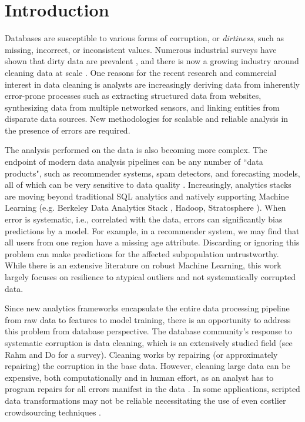 \section{Introduction}
Databases are susceptible to various forms of corruption, or \emph{dirtiness}, such as missing, incorrect, or inconsistent values.
Numerous industrial surveys have shown that dirty data are prevalent \cite{Gartner}, and there is now a growing industry around cleaning data at scale \cite{fortunearticle}.
One reasons for the recent research and commercial interest in data cleaning is analysts are increasingly deriving data from inherently error-prone processes such as extracting structured data from websites, synthesizing data from multiple networked sensors, and linking entities from disparate data sources.
New methodologies for scalable and reliable analysis in the presence of errors are required. 

The analysis performed on the data is also becoming more complex.
The endpoint of modern data analysis pipelines can be any number of ``data products", such as recommender systems, spam detectors, and forecasting models, all of which can be very sensitive to data quality \cite{xiaofeature}.
Increasingly, analytics stacks are moving beyond traditional SQL analytics and natively supporting Machine Learning (e.g. Berkeley Data Analytics Stack \cite{bdas}, Hadoop, Stratosphere \cite{alexandrov2014stratosphere}).
When error is systematic, i.e., correlated with the data, errors can significantly bias predictions by a model.
For example, in a recommender system, we may find that all users from one region have a missing age attribute.
Discarding or ignoring this problem can make predictions for the affected subpopulation untrustworthy.
While there is an extensive literature on robust Machine Learning, this work largely focuses on resilience to atypical outliers and not systematically corrupted data.

Since new analytics frameworks encapsulate the entire data processing pipeline from raw data to features to model training, there is an opportunity to address this problem from database perspective.  
The database community's response to systematic corruption is data cleaning, which is an extensively studied field (see Rahm and Do \cite{rahm2000data} for a survey).
Cleaning works by repairing (or approximately repairing) the corruption in the base data.
However, cleaning large data can be expensive, both computationally and in human effort, as an analyst has to program repairs for all errors manifest in the data \cite{kandel2012}.
In some applications, scripted data transformations may not be reliable necessitating the use of even costlier crowdsourcing techniques \cite{gokhale2014corleone,park2014crowdfill}.

